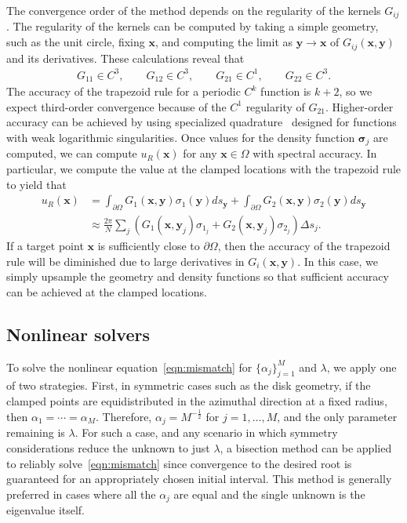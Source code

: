 \documentclass[times]{article}
\newcommand{\bd}{\partial}
\newcommand{\ssigma}{\boldsymbol{\sigma}}
\newcommand{\xx}{\mathbf{x}}
\newcommand{\yy}{\mathbf{y}}
\begin{document}
The convergence order of the method depends on the regularity of the
kernels $G_{ij}$.  The regularity of the kernels can be computed by
taking a simple geometry, such as the unit circle, fixing $\xx$, and
computing the limit as $\yy \rightarrow \xx$ of $G_{ij}(\xx,\yy)$ and
its derivatives.  These calculations reveal that
\begin{align*}
  G_{11} \in C^3, \qquad G_{12} \in C^3, \qquad G_{21} \in C^1, \qquad
  G_{22} \in C^3.
\end{align*}
The accuracy of the trapezoid rule for a periodic $C^k$ function is
$k+2$, so we expect third-order convergence because of the $C^1$
regularity of $G_{21}$.  Higher-order accuracy can be achieved by using
specialized quadrature~\cite{alp1999, kap-rok1997} designed for
functions with weak logarithmic singularities. Once values for the
density function $\ssigma_j$ are computed, we can compute $u_R(\xx)$ for
any $\xx \in \Omega$ with spectral accuracy.  In particular, we compute
the value at the clamped locations with the trapezoid rule to yield that
\begin{align*}
  u_{R}(\xx) &= \int_{\bd\Omega} G_{1}(\xx,\yy)\sigma_{1}(\yy) ds_{\yy} +
             \int_{\bd\Omega} G_{2}(\xx,\yy)\sigma_{2}(\yy) ds_{\yy}\\[5pt]
             &\approx \frac{2\pi}{N} \sum_{j} \left( G_{1}(\xx,\yy_j) \sigma_{1_j} +
                G_{2}(\xx,\yy_j) \sigma_{2_j}
                \right)\Delta s_j.
\end{align*}
If a target point $\xx$ is sufficiently close to $\bd\Omega$, then the
accuracy of the trapezoid rule will be diminished due to large derivatives
in $G_{i}(\xx,\yy)$.  In this case, we simply upsample the geometry and
density functions so that sufficient accuracy can be achieved at the
clamped locations.

\subsection{Nonlinear solvers}\label{sec:Newton}
To solve the nonlinear equation~\eqref{eqn:mismatch} for
$\{\alpha_j\}_{j=1}^{M}$ and $\lambda$, we apply one of two strategies.
First, in symmetric cases such as the disk geometry, if the clamped
points are equidistributed in the azimuthal direction at a fixed radius,
then $\alpha_1 = \cdots = \alpha_M$.  Therefore, $\alpha_j =
M^{-\frac{1}{2}}$ for $j = 1,\ldots,M$, and the only parameter remaining
is $\lambda$. For such a case, and any scenario in which symmetry
considerations reduce the unknown to just $\lambda$, a bisection method
can be applied to reliably solve~\eqref{eqn:mismatch} since convergence
to the desired root is guaranteed for an appropriately chosen initial
interval. This method is generally preferred in cases where all the
$\alpha_j$ are equal and the single unknown is the eigenvalue itself.
\end{document}

